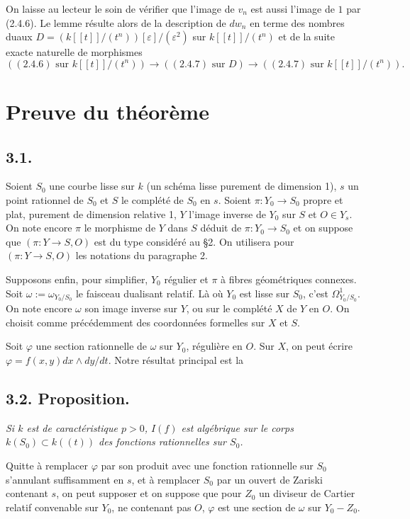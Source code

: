\documentclass[11pt]{article}
\begin{document}
On laisse au lecteur le soin de vérifier que l'image de $v_n$ est aussi l'image de $1$ par (2.4.6). Le lemme résulte alors de la description de $d w_n$ en terme des nombres duaux $D=(k[[t]]/(t^n))[\varepsilon]/(\varepsilon^2)$ sur $k[[t]]/(t^n)$ et de la suite exacte naturelle de morphismes
\[
        ((2.4.6)\text{ sur }k[[t]]/(t^n))\longrightarrow ((2.4.7)\text{ sur }D)
        \longrightarrow ((2.4.7)\text{ sur }k[[t]]/(t^n)).
\]

\section{Preuve du théorème}

\subsection*{3.1.}
Soient $S_0$ une courbe lisse sur $k$ (un schéma lisse purement de dimension 1), $s$ un point rationnel de $S_0$ et $S$ le complété de $S_0$ en $s$. Soient $\pi:Y_0\to S_0$ propre et plat, purement de dimension relative 1, $Y$ l'image inverse de $Y_0$ sur $S$ et $O\in Y_s$. On note encore $\pi$ le morphisme de $Y$ dans $S$ déduit de $\pi:Y_0\to S_0$ et on suppose que $(\pi:Y\to S,O)$ est du type considéré au §2. On utilisera pour $(\pi:Y\to S,O)$ les notations du paragraphe 2.

Supposons enfin, pour simplifier, $Y_0$ régulier et $\pi$ à fibres géométriques connexes. Soit $\omega:=\omega_{Y_0/S_0}$ le faisceau dualisant relatif. Là où $Y_0$ est lisse sur $S_0$, c'est $\Omega^1_{Y_0/S_0}$. On note encore $\omega$ son image inverse sur $Y$, ou sur le complété $X$ de $Y$ en $O$. On choisit comme précédemment des coordonnées formelles sur $X$ et $S$.

Soit $\varphi$ une section rationnelle de $\omega$ sur $Y_0$, régulière en $O$. Sur $X$, on peut écrire $\varphi=f(x,y)dx\wedge dy/dt$. Notre résultat principal est la

\subsection*{3.2. Proposition.}
\emph{Si $k$ est de caractéristique $p>0$, $I(f)$ est algébrique sur le corps $k(S_0)\subset k((t))$ des fonctions rationnelles sur $S_0$.}

Quitte à remplacer $\varphi$ par son produit avec une fonction rationnelle sur $S_0$ s'annulant suffisamment en $s$, et à remplacer $S_0$ par un ouvert de Zariski contenant $s$, on peut supposer et on suppose que pour $Z_0$ un diviseur de Cartier relatif convenable sur $Y_0$, ne contenant pas $O$, $\varphi$ est une section de $\omega$ sur $Y_0-Z_0$.
\end{document}
